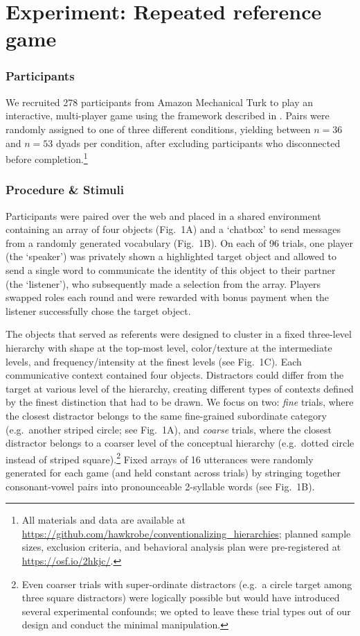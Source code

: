 \documentclass[10pt,letterpaper]{article}
\begin{document}
\section{Experiment: Repeated reference game}

\subsubsection{Participants}

We recruited 278 participants from Amazon Mechanical Turk to play an interactive, multi-player game using the framework described in . Pairs were randomly assigned to one of three different conditions, yielding between $n=36$ and $n=53$ dyads per condition, after excluding participants who disconnected before completion.\footnote{All materials and data are available at \url{https://github.com/hawkrobe/conventionalizing_hierarchies}; planned sample sizes, exclusion criteria, and behavioral analysis plan were pre-registered at \url{https://osf.io/2hkjc/}.}

\subsubsection{Procedure \& Stimuli}
Participants were paired over the web and placed in a shared environment containing an array of four objects (Fig.\ 1A) and a `chatbox' to send messages from a randomly generated vocabulary (Fig.\ 1B). On each of 96 trials, one player (the `speaker') was privately shown a highlighted target object and allowed to send a single word to communicate the identity of this object to their partner (the `listener'), who subsequently made a selection from the array. Players swapped roles each round and were rewarded with bonus payment when the listener successfully chose the target object.

The objects that served as referents were designed to cluster in a fixed three-level hierarchy with shape at the top-most level, color/texture at the intermediate levels, and frequency/intensity at the finest levels (see Fig.\ 1C). Each communicative context contained four objects. Distractors could differ from the target at various level of the hierarchy, creating different types of contexts defined by the finest distinction that had to be drawn. We focus on two: \emph{fine} trials, where the closest distractor belongs to the same fine-grained subordinate category (e.g.\ another striped circle; see Fig.\ 1A), and \emph{coarse} trials, where the closest distractor belongs to a coarser level of the conceptual hierarchy (e.g.\ dotted circle instead of striped square).\footnote{Even coarser trials with super-ordinate distractors (e.g.\ a circle target among three square distractors) were logically possible but would have introduced several experimental confounds; we opted to leave these trial types out of our design and conduct the minimal manipulation.} Fixed arrays of 16 utterances were randomly generated for each game (and held constant across trials) by stringing together consonant-vowel pairs into pronounceable 2-syllable words (see Fig.\ 1B).
\end{document}
